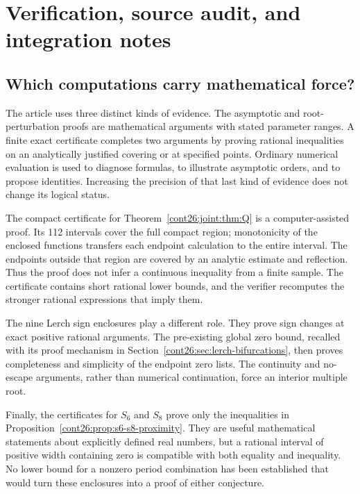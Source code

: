 \section{Verification, source audit, and integration notes}
\label{cont26:sec:verification}

\subsection{Which computations carry mathematical force?}

The article uses three distinct kinds of evidence. The asymptotic and
root-perturbation proofs are mathematical arguments with stated parameter
ranges. A finite exact certificate completes two arguments by proving
rational inequalities on an analytically justified covering or at
specified points. Ordinary numerical evaluation is used to diagnose
formulas, to illustrate asymptotic orders, and to propose identities.
Increasing the precision of that last kind of evidence does not change
its logical status.

The compact certificate for Theorem~\ref{cont26:joint:thm:Q} is a
computer-assisted proof. Its 112 intervals cover the full compact
region; monotonicity of the enclosed functions transfers each endpoint
calculation to the entire interval. The endpoints outside that region
are covered by an analytic estimate and reflection. Thus the proof
does not infer a continuous inequality from a finite sample.
The certificate contains short rational lower bounds, and the verifier
recomputes the stronger rational expressions that imply them.

The nine Lerch sign enclosures play a different role. They prove
sign changes at exact positive rational arguments. The pre-existing
global zero bound, recalled with its proof mechanism in
Section~\ref{cont26:sec:lerch-bifurcations}, then proves completeness and
simplicity of the endpoint zero lists. The continuity and no-escape
arguments, rather than numerical continuation, force an interior
multiple root.

Finally, the certificates for $S_6$ and $S_8$ prove only the inequalities
in Proposition~\ref{cont26:prop:s6-s8-proximity}. They are useful mathematical
statements about explicitly defined real numbers, but a rational
interval of positive width containing zero is compatible with both
equality and inequality. No lower bound for a nonzero period
combination has been established that would turn these enclosures
into a proof of either conjecture.


